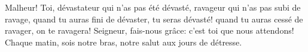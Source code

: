 Malheur! Toi, dévastateur qui n’as pas été dévasté, ravageur qui n’as pas subi de ravage,
	quand tu auras fini de dévaster, tu seras dévasté!
	quand tu auras cessé de ravager, on te ravagera!
Seigneur, fais-nous grâce: c’est toi que nous attendons!
	Chaque matin, sois notre bras, notre salut aux jours de détresse.
